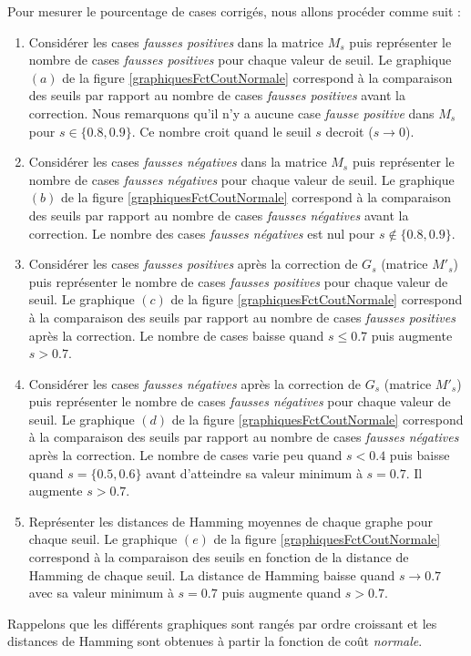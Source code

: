 
Pour mesurer le pourcentage de cases corrig\'es, nous allons proc\'eder comme suit :
\begin{enumerate}[label = (\alph*)]
	\item Consid\'erer les cases {\em fausses positives} dans la matrice $M_s$ puis repr\'esenter le nombre de cases {\em fausses positives} pour chaque valeur de seuil. 
	Le graphique $(a)$ de la figure \ref{graphiquesFctCoutNormale} correspond \`a  la comparaison des seuils par rapport au nombre de cases {\em fausses positives} avant la correction.
	Nous remarquons qu'il n'y a aucune case {\em fausse positive} dans $M_s$ pour $s\in\{0.8,0.9\}$. Ce nombre croit quand le seuil $s$ decroit ($s \rightarrow 0$).
	
	\item Consid\'erer les cases {\em fausses n\'egatives} dans la matrice $M_s$ puis repr\'esenter le nombre de cases {\em fausses n\'egatives} pour chaque valeur de seuil.  Le graphique $(b)$ de la figure \ref{graphiquesFctCoutNormale}  correspond \`a la comparaison des seuils par rapport au nombre de cases {\em fausses n\'egatives} avant la correction. Le nombre des cases {\em fausses n\'egatives} est nul pour $s \not \in \{0.8,0.9\}$. 

	\item Consid\'erer les cases {\em fausses positives} apr\`es la correction de $G_s$ (matrice $M'_s$) puis repr\'esenter le nombre de cases {\em fausses positives} pour chaque valeur de seuil. Le graphique $(c)$ de la figure \ref{graphiquesFctCoutNormale} correspond \`a  la comparaison des seuils par rapport au nombre de cases {\em fausses positives} apr\`es la correction.
	 Le nombre de cases baisse quand $s \le 0.7$ puis augmente $s>0.7$.
	 
	\item Consid\'erer les cases {\em fausses n\'egatives} apr\`es la correction de $G_s$ (matrice $M'_s$) puis repr\'esenter le nombre de cases {\em fausses n\'egatives} pour chaque valeur de seuil. Le graphique $(d)$ de la figure \ref{graphiquesFctCoutNormale} correspond \`a la comparaison des seuils par rapport au nombre de cases {\em fausses n\'egatives} apr\`es la correction. Le nombre de cases varie peu quand $s < 0.4$ puis baisse quand $s = \{0.5, 0.6\}$ avant d'atteindre sa valeur minimum \`a $s = 0.7$. Il augmente $s>0.7$.
	
	\item Repr\'esenter les distances de Hamming moyennes de chaque graphe pour chaque seuil. Le graphique $(e)$ de la figure \ref{graphiquesFctCoutNormale} correspond \`a la comparaison des seuils en fonction de la distance de Hamming de chaque seuil.
	La distance de Hamming baisse quand $s \rightarrow 0.7$ avec sa valeur minimum \`a $s = 0.7$ puis augmente quand $s > 0.7$. 
\end{enumerate}
Rappelons que les diff\'erents graphiques sont rang\'es par ordre croissant et 
les distances de Hamming sont obtenues \`a partir la fonction de co\^ut {\em normale}.

